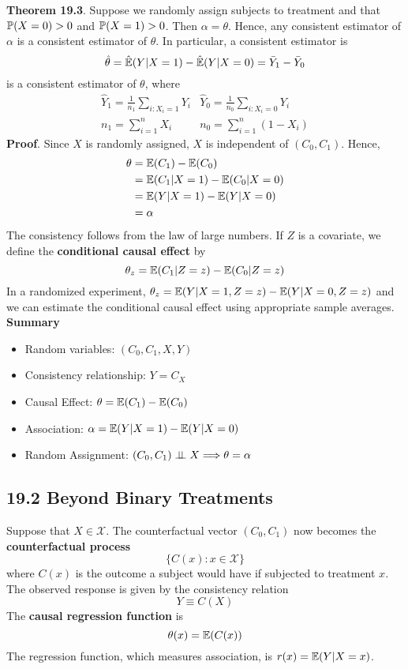 \textbf{Theorem 19.3}. Suppose we randomly assign subjects to treatment
and that \(\operatorname{\mathbb{P}}(X = 0) > 0\) and \(\operatorname{\mathbb{P}}(X = 1) > 0\). Then
\(\alpha = \theta\). Hence, any consistent estimator of \(\alpha\) is a
consistent estimator of \(\theta\). In particular, a consistent
estimator is
\[
\hat{\theta} = \hat{\operatorname{\mathbb{E}}}(Y | X = 1) - \hat{\operatorname{\mathbb{E}}}(Y | X = 0) = \bar{Y}_{1} - \bar{Y}_{0}
\]
is a consistent estimator of \(\theta\), where
\[
\begin{array}{ll}
\hat{Y}_{1} = \frac{1}{n_{1}} \sum_{i: X_{i} = 1} Y_{i}
&
\hat{Y}_{0} = \frac{1}{n_{0}} \sum_{i: X_{i} = 0} Y_{i} \\
n_{1} = \sum_{i=1}^{n} X_{i}
&
n_{0} = \sum_{i=1}^{n} (1 - X_{i})
\end{array}
\]
\textbf{Proof}. Since \(X\) is randomly assigned, \(X\) is independent
of \((C_{0}, C_{1})\). Hence,
\begin{align*}
\theta &= \operatorname{\mathbb{E}}(C_{1}) - \operatorname{\mathbb{E}}(C_{0}) \\
&= \operatorname{\mathbb{E}}(C_{1} | X = 1) - \operatorname{\mathbb{E}}(C_{0} | X = 0) \\
&= \operatorname{\mathbb{E}}(Y | X = 1) - \operatorname{\mathbb{E}}(Y | X = 0) \\
&= \alpha
\end{align*}
The consistency follows from the law of large numbers.
If \(Z\) is a covariate, we define the \textbf{conditional causal
effect} by
\[
\theta_z = \operatorname{\mathbb{E}}(C_{1} | Z = z) - \operatorname{\mathbb{E}}(C_{0} | Z = z)
\]
In a randomized experiment,
\(\theta_z = \operatorname{\mathbb{E}}(Y | X = 1, Z = z) - \operatorname{\mathbb{E}}(Y | X = 0, Z = z)\)
and we can estimate the conditional causal effect using appropriate
sample averages.
\textbf{Summary}
\begin{itemize}[tightlist]
\item
  Random variables: \((C_{0}, C_{1}, X, Y)\)
\item
  Consistency relationship: \(Y = C_X\)
\item
  Causal Effect: \(\theta = \operatorname{\mathbb{E}}(C_{1}) - \operatorname{\mathbb{E}}(C_{0})\)
\item
  Association:
  \(\alpha = \operatorname{\mathbb{E}}(Y | X = 1) - \operatorname{\mathbb{E}}(Y | X = 0)\)
\item
  Random Assignment:
  \((C_{0}, C_{1}) \perp\!\!\!\perp X \Longrightarrow \theta = \alpha\)
\end{itemize}

\subsection*{19.2 Beyond Binary Treatments}\label{beyond-binary-treatments}
Suppose that \(X \in \mathcal{X}\). The counterfactual vector
\((C_{0}, C_{1})\) now becomes the \textbf{counterfactual process}
\[
\{ C(x) : x \in \mathcal{X} \}
\]
where \(C(x)\) is the outcome a subject would have if subjected to
treatment \(x\). The observed response is given by the consistency
relation
\[
Y \equiv C(X)
\]
The \textbf{causal regression function} is
\[
\theta(x) = \operatorname{\mathbb{E}}(C(x))
\]
The regression function, which measures association, is
\(r(x) = \operatorname{\mathbb{E}}(Y | X = x)\).

